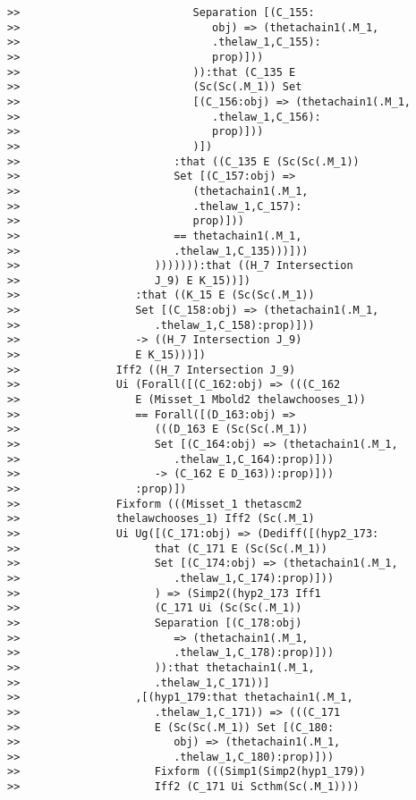 \documentclass[12pt]{article}
\begin{document}
\begin{verbatim}
>>                           Separation [(C_155:
>>                              obj) => (thetachain1(.M_1,
>>                              .thelaw_1,C_155):
>>                              prop)]))
>>                           )):that (C_135 E
>>                           (Sc(Sc(.M_1)) Set
>>                           [(C_156:obj) => (thetachain1(.M_1,
>>                              .thelaw_1,C_156):
>>                              prop)]))
>>                           )])
>>                        :that ((C_135 E (Sc(Sc(.M_1))
>>                        Set [(C_157:obj) =>
>>                           (thetachain1(.M_1,
>>                           .thelaw_1,C_157):
>>                           prop)]))
>>                        == thetachain1(.M_1,
>>                        .thelaw_1,C_135)))]))
>>                     ))))))):that ((H_7 Intersection
>>                     J_9) E K_15))])
>>                  :that ((K_15 E (Sc(Sc(.M_1))
>>                  Set [(C_158:obj) => (thetachain1(.M_1,
>>                     .thelaw_1,C_158):prop)]))
>>                  -> ((H_7 Intersection J_9)
>>                  E K_15)))])
>>               Iff2 ((H_7 Intersection J_9)
>>               Ui (Forall([(C_162:obj) => (((C_162
>>                  E (Misset_1 Mbold2 thelawchooses_1))
>>                  == Forall([(D_163:obj) =>
>>                     (((D_163 E (Sc(Sc(.M_1))
>>                     Set [(C_164:obj) => (thetachain1(.M_1,
>>                        .thelaw_1,C_164):prop)]))
>>                     -> (C_162 E D_163)):prop)]))
>>                  :prop)])
>>               Fixform (((Misset_1 thetascm2
>>               thelawchooses_1) Iff2 (Sc(.M_1)
>>               Ui Ug([(C_171:obj) => (Dediff([(hyp2_173:
>>                     that (C_171 E (Sc(Sc(.M_1))
>>                     Set [(C_174:obj) => (thetachain1(.M_1,
>>                        .thelaw_1,C_174):prop)]))
>>                     ) => (Simp2((hyp2_173 Iff1
>>                     (C_171 Ui (Sc(Sc(.M_1))
>>                     Separation [(C_178:obj)
>>                        => (thetachain1(.M_1,
>>                        .thelaw_1,C_178):prop)]))
>>                     )):that thetachain1(.M_1,
>>                     .thelaw_1,C_171))]
>>                  ,[(hyp1_179:that thetachain1(.M_1,
>>                     .thelaw_1,C_171)) => (((C_171
>>                     E (Sc(Sc(.M_1)) Set [(C_180:
>>                        obj) => (thetachain1(.M_1,
>>                        .thelaw_1,C_180):prop)]))
>>                     Fixform (((Simp1(Simp2(hyp1_179))
>>                     Iff2 (C_171 Ui Scthm(Sc(.M_1))))

\end{verbatim}
\end{document}
